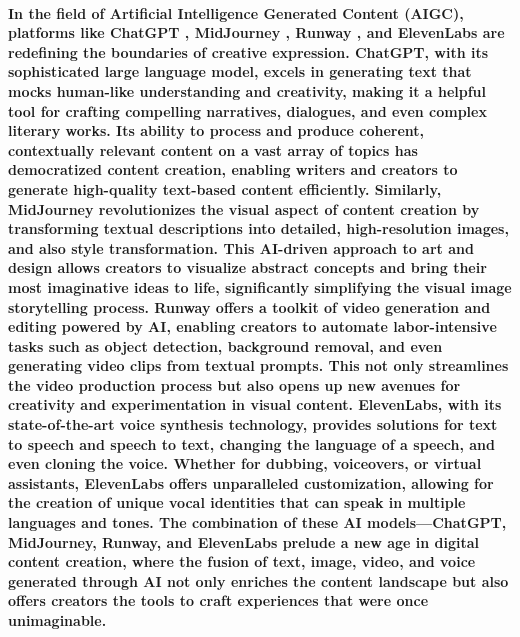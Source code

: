 \documentclass[11pt,a4paper,oneside]{report}
\begin{document}
\paragraph{In the field of Artificial Intelligence Generated Content (AIGC), platforms like ChatGPT \cite{leiter2023chatgpt} \cite{openai2023gpt}, MidJourney \cite{MidjourneyExplore}, Runway \cite{runwayml}, and ElevenLabs \cite{elevenlabs} are redefining the boundaries of creative expression. 
ChatGPT, with its sophisticated large language model, excels in generating text that mocks human-like understanding and creativity, making it a helpful tool for crafting compelling narratives, dialogues, and even complex literary works. 
Its ability to process and produce coherent, contextually relevant content on a vast array of topics has democratized content creation, enabling writers and creators to generate high-quality text-based content efficiently. 
Similarly, MidJourney revolutionizes the visual aspect of content creation by transforming textual descriptions into detailed, high-resolution images, and also style transformation.
This AI-driven approach to art and design allows creators to visualize abstract concepts and bring their most imaginative ideas to life, significantly simplifying the visual image storytelling process. 
Runway offers a toolkit of video generation and editing powered by AI, enabling creators to automate labor-intensive tasks such as object detection, background removal, and even generating video clips from textual prompts. 
This not only streamlines the video production process but also opens up new avenues for creativity and experimentation in visual content. 
ElevenLabs, with its state-of-the-art voice synthesis technology, provides solutions for text to speech and speech to text, changing the language of a speech, and even cloning the voice.
Whether for dubbing, voiceovers, or virtual assistants, ElevenLabs offers unparalleled customization, allowing for the creation of unique vocal identities that can speak in multiple languages and tones. 
The combination of these AI models—ChatGPT, MidJourney, Runway, and ElevenLabs prelude a new age in digital content creation, where the fusion of text, image, video, and voice generated through AI not only enriches the content landscape but also offers creators the tools to craft experiences that were once unimaginable.
}
\end{document}
